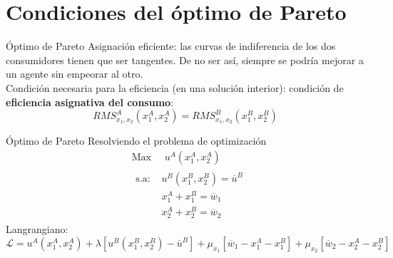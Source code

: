 \section[Pareto]{Condiciones del óptimo de Pareto}

\begin{frame}{Óptimo de Pareto}
	Asignación eficiente: las curvas de indiferencia de los dos consumidores tienen que ser tangentes. De no ser así, siempre se podría mejorar a un agente sin empeorar al otro.\\
	
	Condición necesaria para la eficiencia (en una solución interior): condición de \textbf{eficiencia asignativa del consumo}:
		$$RMS_{x_1,x_2}^{A}(x_{1}^{A},x_{2}^{A})=RMS_{x_1,x_2}^{B}(x_{1}^{B},x_{2}^{B})$$
\end{frame}
\begin{frame}{Óptimo de Pareto}
	Resolviendo el problema de optimización
		\begin{align*}
			& \text{Max } \quad u^{A}\left(x_{1}^{A},x_{2}^{A}\right) \\
			& \begin{array}{ll}
				\text{s.a: } & u^{B}\left(x_{1}^{B},x_{2}^{B} \right) = \overline{u}^{B}\\
				& x_{1}^{A}+x_{1}^{B} = \overline{w}_1  \\
				& x_{2}^{A}+x_{2}^{B} = \overline{w}_2  
			\end{array}
		\end{align*}
	Langrangiano:\\
	{\small $$\mathscr{L} = u^{A}\left( x_{1}^{A},x_{2}^{A}\right)  + \lambda \left[u^{B}(x_{1}^{B},x_{2}^{B}) - \overline{u}^{B}\right] +\mu_{x_1}\left[\overline{w}_1-x_{1}^{A}-x_{1}^{B} \right] +\mu_{x_2}\left[\overline{w}_2-x_{2}^{A}-x_{2}^{B}\right]$$}
\end{frame}
